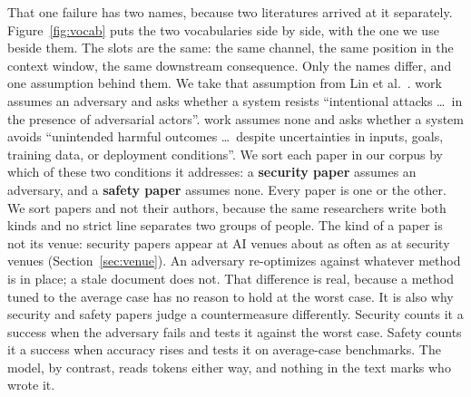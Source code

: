 That one failure has two names, because two literatures arrived at it
separately. Figure~\ref{fig:vocab} puts the two vocabularies side by side,
with the one we use beside them.
The slots are the same: the same channel, the same position in the context
window, the same downstream consequence. Only the names differ, and one
assumption behind them. We take that assumption from Lin et
al.~\cite{lin-2025-safety-security}.  work assumes an
adversary and asks whether a system resists ``intentional attacks \ldots\ in
the presence of adversarial actors''.  work assumes none and
asks whether a system avoids ``unintended harmful outcomes \ldots\ despite
uncertainties in inputs, goals, training data, or deployment conditions''.
We sort each paper in our corpus by which of these two conditions it
addresses: a \textbf{security paper} assumes an adversary, and a
\textbf{safety paper} assumes none. Every paper is one or the other. We sort
papers and not their authors, because the same researchers write both kinds
and no strict line separates two groups of people. The kind of a paper is not its venue: security papers appear at AI venues
about as often as at security venues (Section~\ref{sec:venue}).
An adversary re-optimizes against whatever method is in place; a stale
document does not. That difference is real, because a method tuned to the
average case has no reason to hold at the worst case. It is also why
security and safety papers judge a countermeasure differently. Security counts it a success
when the adversary fails and tests it against the worst case. Safety counts
it a success when accuracy rises and tests it on average-case benchmarks.
The model, by contrast, reads tokens either way, and nothing in the text
marks who wrote it.

